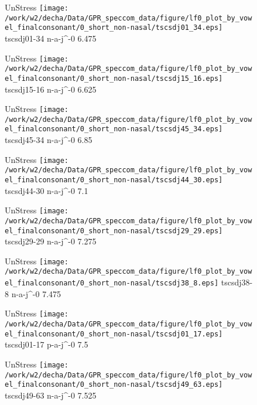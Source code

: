 \documentclass{article}
\begin{document}
\begin{figure}[t]
\begin{minipage}[b]{.24\textwidth}
UnStress
\centering
\texttt{[image: /work/w2/decha/Data/GPR\_speccom\_data/figure/lf0\_plot\_by\_vowel\_finalconsonant/0\_short\_non-nasal/tscsdj01\_34.eps]}
tscsdj01-34 n-a-j\textasciicircum-0 6.475
\end{minipage}
\begin{minipage}[b]{.24\textwidth}
UnStress
\centering
\texttt{[image: /work/w2/decha/Data/GPR\_speccom\_data/figure/lf0\_plot\_by\_vowel\_finalconsonant/0\_short\_non-nasal/tscsdj15\_16.eps]}
tscsdj15-16 n-a-j\textasciicircum-0 6.625
\end{minipage}
\begin{minipage}[b]{.24\textwidth}
UnStress
\centering
\texttt{[image: /work/w2/decha/Data/GPR\_speccom\_data/figure/lf0\_plot\_by\_vowel\_finalconsonant/0\_short\_non-nasal/tscsdj45\_34.eps]}
tscsdj45-34 n-a-j\textasciicircum-0 6.85
\end{minipage}
\begin{minipage}[b]{.24\textwidth}
UnStress
\centering
\texttt{[image: /work/w2/decha/Data/GPR\_speccom\_data/figure/lf0\_plot\_by\_vowel\_finalconsonant/0\_short\_non-nasal/tscsdj44\_30.eps]}
tscsdj44-30 n-a-j\textasciicircum-0 7.1
\end{minipage}
\end{figure}

\begin{figure}[t]
\begin{minipage}[b]{.24\textwidth}
UnStress
\centering
\texttt{[image: /work/w2/decha/Data/GPR\_speccom\_data/figure/lf0\_plot\_by\_vowel\_finalconsonant/0\_short\_non-nasal/tscsdj29\_29.eps]}
tscsdj29-29 n-a-j\textasciicircum-0 7.275
\end{minipage}
\begin{minipage}[b]{.24\textwidth}
UnStress
\centering
\texttt{[image: /work/w2/decha/Data/GPR\_speccom\_data/figure/lf0\_plot\_by\_vowel\_finalconsonant/0\_short\_non-nasal/tscsdj38\_8.eps]}
tscsdj38-8 n-a-j\textasciicircum-0 7.475
\end{minipage}
\begin{minipage}[b]{.24\textwidth}
UnStress
\centering
\texttt{[image: /work/w2/decha/Data/GPR\_speccom\_data/figure/lf0\_plot\_by\_vowel\_finalconsonant/0\_short\_non-nasal/tscsdj01\_17.eps]}
tscsdj01-17 p-a-j\textasciicircum-0 7.5
\end{minipage}
\begin{minipage}[b]{.24\textwidth}
UnStress
\centering
\texttt{[image: /work/w2/decha/Data/GPR\_speccom\_data/figure/lf0\_plot\_by\_vowel\_finalconsonant/0\_short\_non-nasal/tscsdj49\_63.eps]}
tscsdj49-63 n-a-j\textasciicircum-0 7.525
\end{minipage}
\end{figure}
\end{document}
